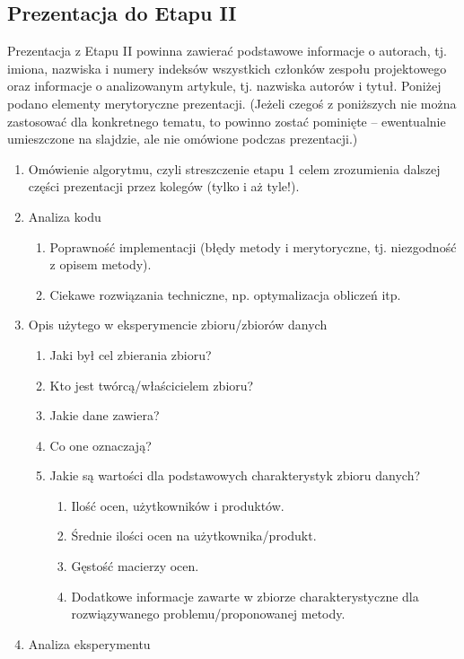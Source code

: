 \documentclass{article}
\begin{document}
\subsection{Prezentacja do Etapu II}
Prezentacja z Etapu II powinna zawierać podstawowe informacje
o autorach, tj. imiona, nazwiska i numery indeksów wszystkich członków
zespołu projektowego oraz informacje o analizowanym artykule, tj. nazwiska
autorów i tytuł. 
Poniżej podano elementy merytoryczne prezentacji. (Jeżeli czegoś z poniższych
nie można zastosować dla konkretnego tematu, to powinno zostać pominięte – 
ewentualnie umieszczone na slajdzie, ale nie omówione podczas prezentacji.)
\begin{enumerate}
    \item Omówienie algorytmu, czyli streszczenie etapu 1 celem zrozumienia
    dalszej części prezentacji przez kolegów (tylko i aż tyle!).
    \item Analiza kodu
    \begin{enumerate}
        \item Poprawność implementacji (błędy metody i merytoryczne, tj.
        niezgodność z opisem metody).
        \item Ciekawe rozwiązania techniczne, np. optymalizacja obliczeń itp.
    \end{enumerate}
    \item Opis użytego w eksperymencie zbioru/zbiorów danych
    \begin{enumerate}
        \item Jaki był cel zbierania zbioru?
        \item Kto jest twórcą/właścicielem zbioru?
        \item Jakie dane zawiera?
        \item Co one oznaczają?
        \item Jakie są wartości dla podstawowych charakterystyk zbioru danych?
        \begin{enumerate}
            \item Ilość ocen, użytkowników i produktów.
            \item Średnie ilości ocen na użytkownika/produkt.
            \item Gęstość macierzy ocen.
            \item Dodatkowe informacje zawarte w zbiorze charakterystyczne dla
            rozwiązywanego problemu/proponowanej metody.
        \end{enumerate}
    \end{enumerate}
    \item Analiza eksperymentu

\end{enumerate}
\end{document}
